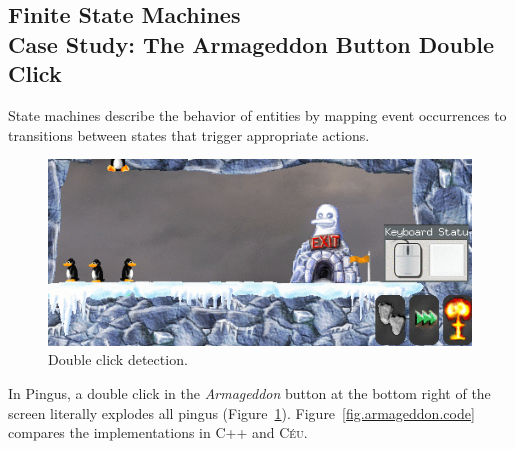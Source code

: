 \documentclass{vgtc}                          %
\newcommand{\CEU}{\textsc{C\'{e}u}\xspace}
\begin{document}
\subsection{Finite State Machines \\ Case Study: The Armageddon Button Double Click}

State machines describe the behavior of entities by mapping event occurrences
to transitions between states that trigger appropriate actions.


\begin{figure}
\centering
\includegraphics[width=\columnwidth]{double-click-opt}
\caption{Double click detection.
\label{fig.armageddon}
}
\end{figure}

In Pingus, a double click in the \emph{Armageddon} button at the bottom right
of the screen literally explodes all pingus (Figure~\ref{fig.armageddon}).
Figure~\ref{fig.armageddon.code} compares the implementations in C++ and \CEU.
\end{document}
